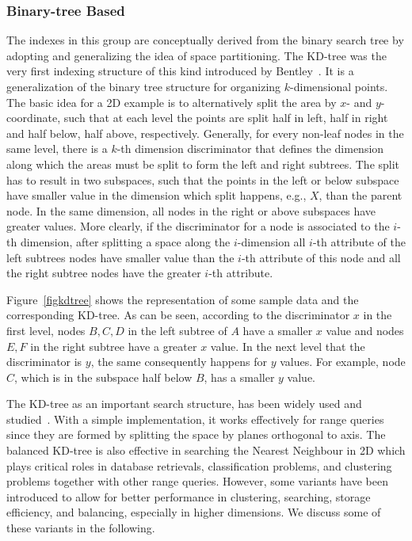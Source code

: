 \documentclass[a4paper,12pt]{article}
\begin{document}
\subsubsection{Binary-tree Based}
\label{binary-tree-based}
The indexes in this group are conceptually derived from the binary search tree by adopting and generalizing the idea of space partitioning. 
The KD-tree was the very first indexing structure of this kind introduced by Bentley~\cite{bently1975}. 
It is a generalization of the binary tree structure for organizing $k$-dimensional points. The basic idea for a 2D example is to alternatively split the area by $x$- and $y$-coordinate, such that at each level the points are split half in left, half in right and half below, half above, respectively. Generally, for every non-leaf nodes in the same level, there is a $k$-th dimension discriminator that defines the dimension along which the areas must be split to form the left and right subtrees. The split has to result in two subspaces, such that the points in the left or below subspace have smaller value in the dimension which split happens, e.g., $X$, than the parent node. In the same dimension, all nodes in the right or above subspaces have greater values. More clearly, if the discriminator for a node is associated to the $i$-th dimension, after splitting a space along the $i$-dimension all $i$-th attribute of the left subtrees nodes have smaller value than the $i$-th attribute of this node and all the right subtree nodes have the greater $i$-th attribute. 

Figure~\ref{figkdtree} shows the representation of some sample data and the corresponding KD-tree. As can be seen, according to the discriminator $x$ in the first level, nodes $B, C, D$ in the left subtree of $A$ have a smaller $x$ value and nodes $E, F$ in the right subtree have a greater $x$ value. In the next level that the discriminator is $y$, the same consequently happens for $y$ values. For example, node $C$, which is in the subspace half below $B$, has a smaller $y$ value.

The KD-tree as an important search structure, has been widely used and studied~\cite{ilprints723}. With a simple implementation, it works effectively for range queries since they are formed by splitting the space by planes orthogonal to axis. The balanced KD-tree is also effective in searching the Nearest Neighbour in 2D which plays critical roles in database retrievals, classification problems, and clustering problems together with other range queries. However, some variants have been introduced to allow for better performance in clustering, searching, storage efficiency,  
and balancing, especially in higher dimensions. We discuss some of these variants in the following.
\end{document}
